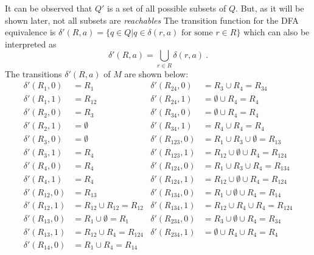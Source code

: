 \begin{solution}
    It can be observed that $Q'$ is a set of all possible subsets of $Q$. But, as it will be shown later, not all subsets are \textit{reachables} The transition function for the DFA equivalence is $\delta'(R,a) = \{q \in Q | q \in \delta(r,a) \text{ for some } r \in R\}$ which can also be interpreted as 
    \begin{equation*}
        \delta'(R,a) = \bigcup\limits_{r \in R} \delta(r,a)\ .
    \end{equation*}
    The transitions $\delta'(R,a)$ of $M$ are shown below:
    \begin{align*}
        \delta'(R_{1}, 0) & = R_{1} & %
            \delta'(R_{24}, 0) & = R_{3} \cup R_{4} = R_{34} \\
        \delta'(R_{1}, 1) & = R_{12} & %
            \delta'(R_{24}, 1) & = \emptyset \cup R_{4} = R_{4} \\
        \delta'(R_{2}, 0) & = R_{3} & %
            \delta'(R_{34}, 0) & = \emptyset \cup R_{4} = R_{4} \\
        \delta'(R_{2}, 1) & = \emptyset & %
            \delta'(R_{34}, 1) & = R_{4} \cup R_{4} = R_{4} \\
        \delta'(R_{3}, 0) & = \emptyset & %
            \delta'(R_{123}, 0) & = R_{1} \cup R_{3} \cup \emptyset = R_{13} \\
        \delta'(R_{3}, 1) & = R_{4} & %
            \delta'(R_{123}, 1) & = R_{12} \cup \emptyset \cup R_{4} = R_{124} \\
        \delta'(R_{4}, 0) & = R_{4} & %
            \delta'(R_{124}, 0) & = R_{1} \cup R_{3} \cup R_{4} = R_{134} \\
        \delta'(R_{4}, 1) & = R_{4} & %
            \delta'(R_{124}, 1) & = R_{12} \cup \emptyset \cup R_{4} = R_{124} \\
        \delta'(R_{12}, 0) & = R_{13} & %
            \delta'(R_{134}, 0) & = R_{1} \cup \emptyset \cup R_{4} = R_{14} \\
        \delta'(R_{12}, 1) & = R_{12} \cup R_{12} = R_{12} & %
            \delta'(R_{134}, 1) & = R_{12} \cup R_{4} \cup R_{4} = R_{124} \\
        \delta'(R_{13}, 0) & = R_{1} \cup \emptyset = R_{1} & %
            \delta'(R_{234}, 0) & = R_{3} \cup \emptyset \cup R_{4} = R_{34} \\
        \delta'(R_{13}, 1) & = R_{12} \cup R_{4} = R_{124} & %
            \delta'(R_{234}, 1) & = \emptyset \cup R_{4} \cup R_{4} = R_{4} \\
        \delta'(R_{14}, 0) & = R_{1} \cup R_{4} = R_{14} & %

\end{align*}
\end{solution}
